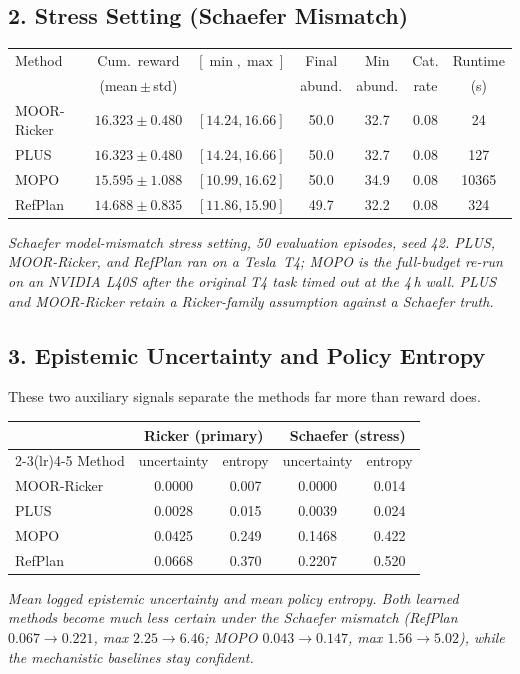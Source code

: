 \documentclass[11pt]{article}
\begin{document}
\subsection*{2. Stress Setting (Schaefer Mismatch)}
\begin{center}
\begin{tabular}{lcccccc}
\toprule
Method & Cum.\ reward & $[\min,\max]$ & Final & Min & Cat. & Runtime \\
       & (mean\,$\pm$\,std) &        & abund. & abund. & rate & (s) \\
\midrule
MOOR-Ricker & $16.323 \pm 0.480$ & $[14.24, 16.66]$ & 50.0 & 32.7 & 0.08 & 24 \\
PLUS        & $16.323 \pm 0.480$ & $[14.24, 16.66]$ & 50.0 & 32.7 & 0.08 & 127 \\
MOPO        & $15.595 \pm 1.088$ & $[10.99, 16.62]$ & 50.0 & 34.9 & 0.08 & 10365 \\
RefPlan     & $14.688 \pm 0.835$ & $[11.86, 15.90]$ & 49.7 & 32.2 & 0.08 & 324 \\
\bottomrule
\end{tabular}
\end{center}
\noindent\textit{Schaefer model-mismatch stress setting, 50 evaluation episodes,
seed 42. PLUS, MOOR-Ricker, and RefPlan ran on a Tesla~T4; MOPO is the full-budget
re-run on an NVIDIA L40S after the original T4 task timed out at the 4\,h wall.
PLUS and MOOR-Ricker retain a Ricker-family assumption against a Schaefer truth.}

\subsection*{3. Epistemic Uncertainty and Policy Entropy}
These two auxiliary signals separate the methods far more than reward does.

\begin{center}
\begin{tabular}{lcccc}
\toprule
 & \multicolumn{2}{c}{Ricker (primary)} & \multicolumn{2}{c}{Schaefer (stress)} \\
\cmidrule(lr){2-3}\cmidrule(lr){4-5}
Method & uncertainty & entropy & uncertainty & entropy \\
\midrule
MOOR-Ricker & 0.0000 & 0.007 & 0.0000 & 0.014 \\
PLUS        & 0.0028 & 0.015 & 0.0039 & 0.024 \\
MOPO        & 0.0425 & 0.249 & 0.1468 & 0.422 \\
RefPlan     & 0.0668 & 0.370 & 0.2207 & 0.520 \\
\bottomrule
\end{tabular}
\end{center}
\noindent\textit{Mean logged epistemic uncertainty and mean policy entropy. Both
learned methods become much less certain under the Schaefer mismatch (RefPlan
$0.067 \to 0.221$, max $2.25 \to 6.46$; MOPO $0.043 \to 0.147$, max
$1.56 \to 5.02$), while the mechanistic baselines stay confident.}
\end{document}
